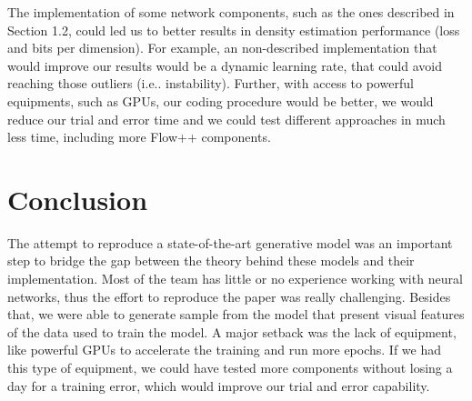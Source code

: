 \documentclass{article}
\makeatletter
\DeclareRobustCommand\onedot{\futurelet\@let@token\@onedot}
\def\@onedot{\ifx\@let@token.\else.\null\fi\xspace}
\def\ie{i.e\onedot} \def\Ie{I.e\onedot}
\makeatother
\begin{document}
The implementation of some network components, such as the ones described in Section 1.2, could led us to better results in density estimation performance (loss and bits per dimension). For example, an non-described implementation that would improve our results would be a dynamic learning rate, that could avoid reaching those outliers (\ie instability). Further, with access to powerful equipments, such as GPUs, our coding procedure would be better, we would reduce our trial and error time and we could test different approaches in much less time, including more Flow++ components. 

\section{Conclusion}

The attempt to reproduce a state-of-the-art generative model was an important step to bridge the gap between the theory behind these models and their implementation. Most of the team has little or no experience working with neural networks, thus the effort to reproduce the paper was really challenging. Besides that, we were able to generate sample from the model that present visual features of the data used to train the model. A major setback was the lack of equipment, like powerful GPUs to accelerate the training and run more epochs. If we had this type of equipment, we could have tested more components without losing a day for a training error, which would improve our trial and error capability. 

\printbibliography
\end{document}
